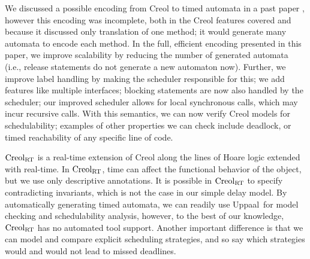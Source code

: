 \documentclass[copyright,creativecommons]{eptcs}
\theoremstyle{definition}
\newcommand{\Uppaal}{{\sc Uppaal}\xspace}
\begin{document}
We discussed a possible encoding from Creol to timed automata in a past paper \cite{fsen09}, however this encoding was incomplete, both in the Creol features covered and because it discussed only translation of one method; it would generate  many automata to encode each method.
In the full, efficient encoding presented in this paper, we improve scalability by reducing the number of generated automata (i.e., release statements do not generate a new automaton now). Further, we improve label handling by making the scheduler responsible for this; we add features like multiple interfaces; blocking statements are now also handled by the scheduler; our improved scheduler allows for local synchronous calls, which may incur recursive calls. With this semantics, we can now verify Creol models for schedulability; examples of other properties we can check include deadlock, or timed reachability of any specific line of code.


${\rm Creol_{RT}}$ \cite{KyasJ08} is a real-time extension of Creol along the lines of   Hoare logic extended with real-time.
In ${\rm Creol_{RT}}$, time can affect the functional behavior of the object, but we use only descriptive annotations.
It is possible in ${\rm Creol_{RT}}$ to specify contradicting invariants, which is not the case in our simple delay model.
By automatically generating timed automata, we can readily use \Uppaal\ for model checking and schedulability analysis, however, to the best of our knowledge, ${\rm Creol_{RT}}$ has no automated tool support.
Another important difference is that we can model and compare explicit scheduling strategies, and so say which strategies would and would not lead to missed deadlines.
\end{document}
